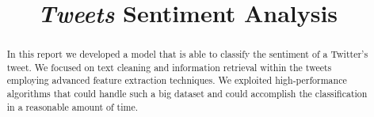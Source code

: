 \documentclass[conference]{IEEEtran}
\begin{document}
\title{\textit{Tweets} Sentiment Analysis}

\author{
\and
{}
}

\maketitle

\begin{abstract}
In this report we developed a model that is able to classify the sentiment of a Twitter's tweet.
We focused on text cleaning and information retrieval within the tweets employing advanced feature extraction techniques.
We exploited high-performance algorithms that could handle such a big dataset and could accomplish the classification in a reasonable amount of time.
\end{abstract}
\end{document}
